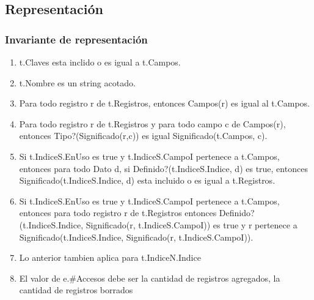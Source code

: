 \newpage
\subsection{Representación}

{
{ 
}
}

  
\subsubsection*{Invariante de representación}

\begin{enumerate}
\item	t.Claves esta inclido o es igual a t.Campos.
% 
\item	t.Nombre es un string acotado.
\item	Para todo registro r de t.Registros, entonces Campos(r) es igual al t.Campos.
\item	Para todo registro r de t.Registros y para todo campo c de Campos(r), entonces Tipo?(Significado(r,c)) es igual Significado(t.Campos, c).
\item	Si t.IndiceS.EnUso es true y t.IndiceS.CampoI pertenece a t.Campos, entonces para todo Dato d, si Definido?(t.IndiceS.Indice, d) es true, entonces Significado(t.IndiceS.Indice, d) esta incluido o es igual a t.Registros.
\item	Si t.IndiceS.EnUso es true y t.IndiceS.CampoI pertenece a t.Campos, entonces para todo registro r de t.Registros entonces Definido?(t.IndiceS.Indice, Significado(r, t.IndiceS.CampoI)) es true y r pertenece a Significado(t.IndiceS.Indice, Significado(r, t.IndiceS.CampoI)).
%
\item	Lo anterior tambien aplica para t.IndiceN.Indice
  \item El valor de e.\#Accesos debe ser la cantidad de registros agregados, la cantidad de registros borrados
\end{enumerate}

